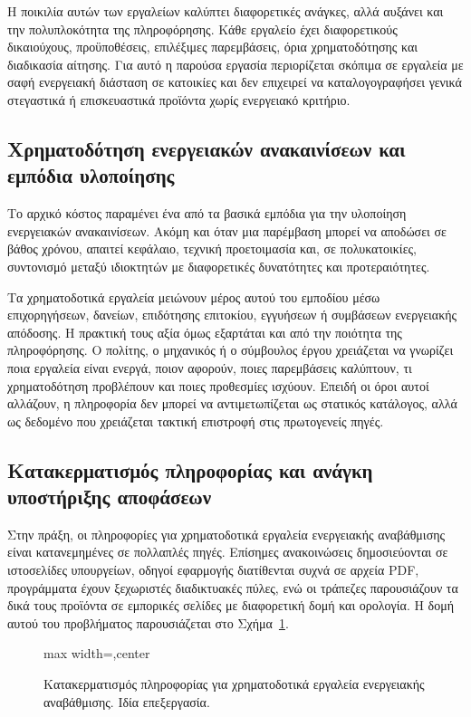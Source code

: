 Η ποικιλία αυτών των εργαλείων καλύπτει διαφορετικές ανάγκες, αλλά αυξάνει και
την πολυπλοκότητα της πληροφόρησης. Κάθε εργαλείο έχει διαφορετικούς
δικαιούχους, προϋποθέσεις, επιλέξιμες παρεμβάσεις, όρια χρηματοδότησης και
διαδικασία αίτησης. Για αυτό η παρούσα εργασία περιορίζεται σκόπιμα σε
εργαλεία με σαφή ενεργειακή διάσταση σε κατοικίες και δεν επιχειρεί να
καταλογογραφήσει γενικά στεγαστικά ή επισκευαστικά προϊόντα χωρίς ενεργειακό
κριτήριο.

\subsection{Χρηματοδότηση ενεργειακών ανακαινίσεων και εμπόδια υλοποίησης}

Το αρχικό κόστος παραμένει ένα από τα βασικά εμπόδια για την υλοποίηση
ενεργειακών ανακαινίσεων. Ακόμη και όταν μια παρέμβαση μπορεί να αποδώσει σε
βάθος χρόνου, απαιτεί κεφάλαιο, τεχνική προετοιμασία και, σε πολυκατοικίες,
συντονισμό μεταξύ ιδιοκτητών με διαφορετικές δυνατότητες και προτεραιότητες.

Τα χρηματοδοτικά εργαλεία μειώνουν μέρος αυτού του εμποδίου μέσω επιχορηγήσεων,
δανείων, επιδότησης επιτοκίου, εγγυήσεων ή συμβάσεων ενεργειακής απόδοσης. Η
πρακτική τους αξία όμως εξαρτάται και από την ποιότητα της πληροφόρησης. Ο
πολίτης, ο μηχανικός ή ο σύμβουλος έργου χρειάζεται να γνωρίζει ποια εργαλεία
είναι ενεργά, ποιον αφορούν, ποιες παρεμβάσεις καλύπτουν, τι χρηματοδότηση
προβλέπουν και ποιες προθεσμίες ισχύουν. Επειδή οι όροι αυτοί αλλάζουν,
η πληροφορία δεν μπορεί να αντιμετωπίζεται ως στατικός κατάλογος, αλλά ως
δεδομένο που χρειάζεται τακτική επιστροφή στις πρωτογενείς πηγές.

\subsection{Κατακερματισμός πληροφορίας και ανάγκη υποστήριξης αποφάσεων}

Στην πράξη, οι πληροφορίες για χρηματοδοτικά εργαλεία ενεργειακής αναβάθμισης
είναι κατανεμημένες σε πολλαπλές πηγές. Επίσημες ανακοινώσεις δημοσιεύονται σε
ιστοσελίδες υπουργείων, οδηγοί εφαρμογής διατίθενται συχνά σε αρχεία PDF,
προγράμματα έχουν ξεχωριστές διαδικτυακές πύλες, ενώ οι τράπεζες παρουσιάζουν
τα δικά τους προϊόντα σε εμπορικές σελίδες με διαφορετική δομή και ορολογία. Η
δομή αυτού του προβλήματος παρουσιάζεται στο
Σχήμα~\ref{fig:information-fragmentation}.

\begin{figure}[!htbp]
    \centering
    \begin{adjustbox}{max width=\textwidth,center}
        
    \end{adjustbox}
    \caption[Κατακερματισμός πληροφορίας χρηματοδοτικών εργαλείων]{Κατακερματισμός πληροφορίας για χρηματοδοτικά εργαλεία ενεργειακής αναβάθμισης. Ιδία επεξεργασία.}
    \label{fig:information-fragmentation}
\end{figure}

